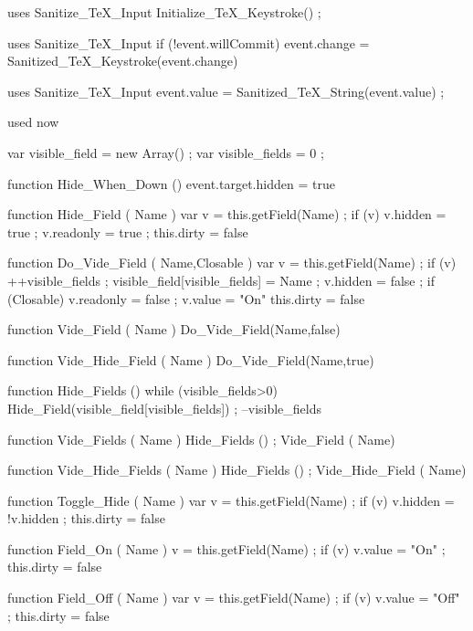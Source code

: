 \stopJSpreamble

 uses {Sanitize_TeX_Input}
  Initialize_TeX_Keystroke() ;
\stopJScode

 uses {Sanitize_TeX_Input}
  if (!event.willCommit)
    { event.change = Sanitized_TeX_Keystroke(event.change) }
\stopJScode

 uses {Sanitize_TeX_Input}
  event.value = Sanitized_TeX_String(event.value) ;
\stopJScode


 used now

var visible_field  = new Array() ; %
var visible_fields = 0 ;

function Hide_When_Down ()
  { event.target.hidden = true }

function Hide_Field ( Name )
  { var v = this.getField(Name) ;
    if (v)
      { v.hidden = true ;
        v.readonly = true ; 
        this.dirty = false } }

function Do_Vide_Field ( Name,Closable )
  { var v = this.getField(Name) ;
    if (v)
      { ++visible_fields ;
        visible_field[visible_fields] = Name ;
        v.hidden = false ;
        if (Closable)  
          { v.readonly = false ; 
            v.value = "On" } 
        this.dirty = false } }

function Vide_Field ( Name )
  { Do_Vide_Field(Name,false) } 

function Vide_Hide_Field ( Name )
  { Do_Vide_Field(Name,true) } 

function Hide_Fields ()
  { while (visible_fields>0)
      { Hide_Field(visible_field[visible_fields]) ;
        --visible_fields } }

function Vide_Fields ( Name ) %
  { Hide_Fields () ;
    Vide_Field ( Name) }

function Vide_Hide_Fields ( Name ) %
  { Hide_Fields () ;
    Vide_Hide_Field ( Name) }

function Toggle_Hide ( Name )
  { var v = this.getField(Name) ;
    if (v) { v.hidden = !v.hidden ; this.dirty = false } }

function Field_On ( Name )
  { v = this.getField(Name) ;
    if (v) { v.value = "On" ; this.dirty = false } }

function Field_Off ( Name )
  { var v = this.getField(Name) ;
    if (v) { v.value = "Off" ; this.dirty = false } }

